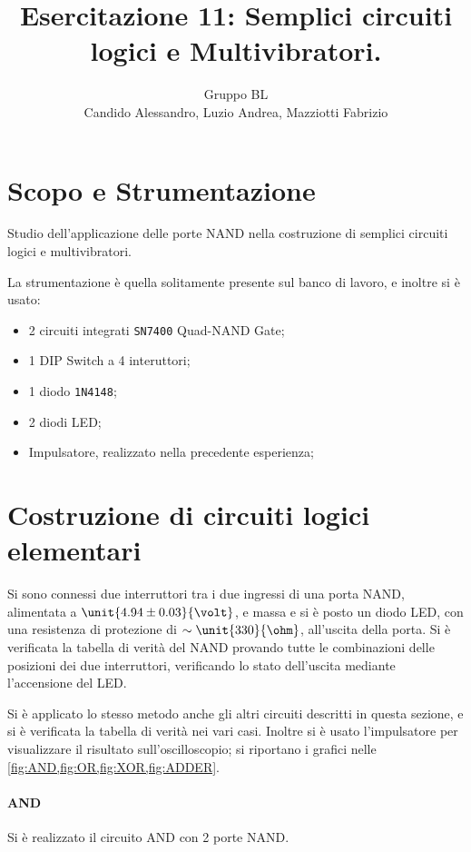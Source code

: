 \documentclass[a4paper,10pt]{article}
\title{Esercitazione 11: Semplici circuiti logici e Multivibratori.}
\author{Gruppo BL \\ Candido Alessandro, Luzio Andrea, Mazziotti Fabrizio}
\def\code#1{\texttt{#1}}
\begin{document}
\maketitle

\section{Scopo e Strumentazione}
Studio dell'applicazione delle porte NAND nella costruzione di semplici circuiti logici e multivibratori.

La strumentazione è quella solitamente presente sul banco di lavoro, e inoltre si è usato:
\begin{itemize}
	\item 2 circuiti integrati \code{SN7400} Quad-NAND Gate;
	\item 1 DIP Switch a 4 interuttori;
	\item 1 diodo \code{1N4148};
	\item 2 diodi LED;
	\item Impulsatore, realizzato nella precedente esperienza;
\end{itemize}

\section{Costruzione di circuiti logici elementari}
Si sono connessi due interruttori tra i due ingressi di una porta NAND, alimentata a $\unit{4.94 \pm 0.03}{\volt}$, e massa e si è posto un diodo LED, con una resistenza di protezione di $\sim \unit{330}{\ohm}$, all'uscita della porta.
Si è verificata la tabella di verità del NAND provando tutte le combinazioni delle posizioni dei due interruttori, verificando lo stato dell'uscita mediante l'accensione del LED.

Si è applicato lo stesso metodo anche gli altri circuiti descritti in questa sezione, e si è verificata la tabella di verità nei vari casi.
Inoltre si è usato l'impulsatore per visualizzare il risultato sull'oscilloscopio; si riportano i grafici nelle \cref{fig:AND,fig:OR,fig:XOR,fig:ADDER}.

\paragraph{AND} Si è realizzato il circuito AND con 2 porte NAND.
\end{document}
